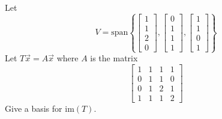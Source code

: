 \documentclass{ximera}
\begin{document}
\begin{problem}\label{prb:10.75} Let
\begin{equation*}
V=\mbox{span}\left\{ \left[
\begin{array}{c}
1 \\
1 \\
2 \\
0
\end{array}
\right] ,\left[
\begin{array}{c}
0 \\
1 \\
1 \\
1
\end{array}
\right] ,\left[
\begin{array}{c}
1 \\
1 \\
0 \\
1
\end{array}
\right] \right\}
\end{equation*}
Let $T\vec{x}=A\vec{x}$ where $A$ is the matrix
\begin{equation*}
\left[
\begin{array}{cccc}
1 & 1 & 1 & 1 \\
0 & 1 & 1 & 0 \\
0 & 1 & 2 & 1 \\
1 & 1 & 1 & 2
\end{array}
\right]
\end{equation*}
Give a basis for $\mbox{im}\left( T\right) $.
\end{problem}
\end{document}
